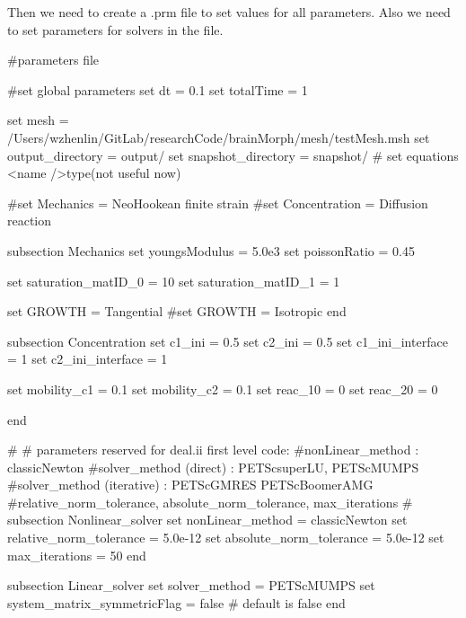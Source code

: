  Then we need to create a {\ttfamily }.prm file to set values for all parameters. Also we need to set parameters for solvers in the file. 
\begin{DoxyCode}
\textcolor{preprocessor}{#parameters file}

\textcolor{preprocessor}{#set global parameters}
\textcolor{keyword}{set} dt = 0.1
set totalTime = 1

\textcolor{keyword}{set} mesh = /Users/wzhenlin/GitLab/researchCode/brainMorph/mesh/testMesh.msh
\textcolor{keyword}{set} output\_directory = output/
\textcolor{keyword}{set} snapshot\_directory = snapshot/
\textcolor{preprocessor}{# set equations <name />type(not useful now)}

\textcolor{preprocessor}{#set Mechanics = NeoHookean finite strain}
\textcolor{preprocessor}{#set Concentration = Diffusion reaction}


subsection Mechanics
        \textcolor{keyword}{set} youngsModulus =  5.0e3
        \textcolor{keyword}{set} poissonRatio =  0.45
            
        \textcolor{keyword}{set} saturation\_matID\_0 = 10
        \textcolor{keyword}{set} saturation\_matID\_1 = 1
        
     \textcolor{keyword}{set} GROWTH = Tangential
\textcolor{preprocessor}{        #set GROWTH = Isotropic}
end

subsection Concentration
        \textcolor{keyword}{set} c1\_ini = 0.5
        \textcolor{keyword}{set} c2\_ini = 0.5
        \textcolor{keyword}{set} c1\_ini\_interface = 1
        \textcolor{keyword}{set} c2\_ini\_interface = 1
                        
        \textcolor{keyword}{set} mobility\_c1 = 0.1
     \textcolor{keyword}{set} mobility\_c2 = 0.1
     \textcolor{keyword}{set} reac\_10 = 0
        \textcolor{keyword}{set} reac\_20 = 0

end
                        
\textcolor{preprocessor}{#}
\textcolor{preprocessor}{# parameters reserved for deal.ii first level code:}
\textcolor{preprocessor}{#nonLinear\_method : classicNewton}
\textcolor{preprocessor}{#solver\_method (direct) : PETScsuperLU, PETScMUMPS}
\textcolor{preprocessor}{#solver\_method (iterative) : PETScGMRES PETScBoomerAMG}
\textcolor{preprocessor}{#relative\_norm\_tolerance, absolute\_norm\_tolerance, max\_iterations}
\textcolor{preprocessor}{#}
subsection Nonlinear\_solver
        \textcolor{keyword}{set} nonLinear\_method = classicNewton
        \textcolor{keyword}{set} relative\_norm\_tolerance = 5.0e-12
        \textcolor{keyword}{set} absolute\_norm\_tolerance = 5.0e-12
        \textcolor{keyword}{set} max\_iterations = 50
end
                        
subsection Linear\_solver
        \textcolor{keyword}{set} solver\_method = PETScMUMPS
        \textcolor{keyword}{set} system\_matrix\_symmetricFlag = \textcolor{keyword}{false} # \textcolor{keywordflow}{default} is \textcolor{keyword}{false}
end
\end{DoxyCode}
